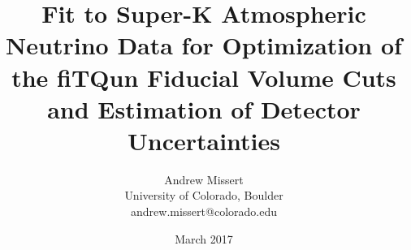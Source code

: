 \documentclass[12pt]{article}
\begin{document}
\title{Fit to Super-K Atmospheric Neutrino Data for Optimization of the fiTQun Fiducial
Volume Cuts and Estimation of Detector Uncertainties}
\author{Andrew Missert\\University of Colorado, Boulder\\andrew.missert@colorado.edu}
\date{March 2017}
\maketitle




\FloatBarrier


\FloatBarrier



\FloatBarrier



\FloatBarrier

%

\FloatBarrier


\FloatBarrier

\appendix






{}




\end{document}
